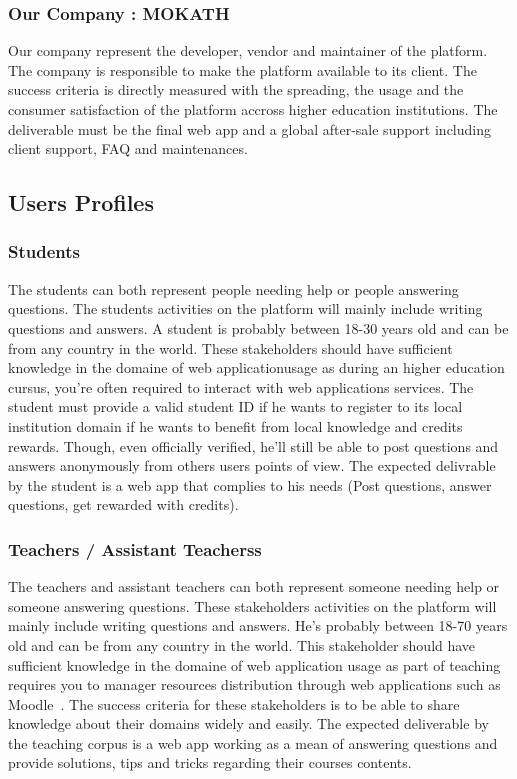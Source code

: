 \documentclass[12pt,a4paper,oneside, titlepage]{article}
\begin{document}
	    \subsubsection{Our Company : MOKATH}
	    Our company represent the developer, vendor and maintainer of the platform. The company is responsible to make the 
	    platform available to its client. The success criteria is directly measured with the spreading, the usage and the 
	    consumer satisfaction of the platform accross higher education institutions. The deliverable must be the final web
	    app and a global after-sale support including client support, FAQ and maintenances.
	    
	\subsection{Users Profiles}
		\subsubsection{Students}
	    The students can both represent people needing help or people answering questions. The students activities on the
	    platform will mainly include writing questions and answers. A student is probably between 18-30 years old and can 
	    be from any country in the world. These stakeholders should have sufficient knowledge in the domaine of web
	    applicationusage as during an higher education cursus, you're often required to interact with web applications 
	    services. The student must provide a valid student ID if he wants to register to its local institution domain if 
	    he wants to benefit from local knowledge and credits rewards. Though, even officially verified, he'll still be
	    able to post questions and answers anonymously from others users points of view. The expected delivrable by the 
	    student is a web app that complies to his needs (Post questions, answer questions, get rewarded with credits).  
	    
	    \subsubsection{Teachers / Assistant Teacherss}
	    The teachers and assistant teachers can both represent someone needing help or someone answering questions. These
	    stakeholders activities on the platform will mainly include writing questions and answers. He's probably between 
	    18-70 years old and can be from any country in the world. This stakeholder should have sufficient knowledge in the 
	    domaine of web application usage as part of teaching requires you to manager resources distribution through web 
	    applications such as Moodle~\cite{moodleWebsite}. The success criteria for these stakeholders is to be able to 
	    share knowledge about their domains widely and easily. The expected deliverable by the teaching corpus is a web 
	    app working as a mean of answering questions and provide solutions, tips and tricks regarding their courses 
	    contents.
	    
\end{document}
